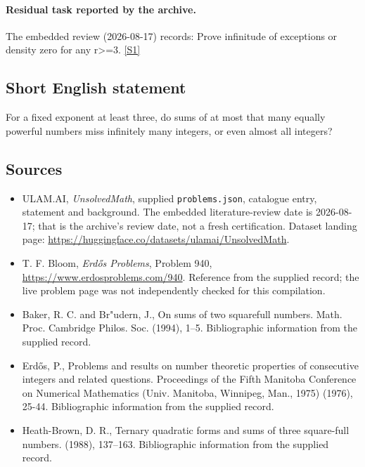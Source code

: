 \documentclass[11pt,a4paper]{article}
\newcommand{\sref}[2]{\hyperlink{source:#1:#2}{[S#2]}}
\begin{document}
\paragraph{Residual task reported by the archive.}

The embedded review (2026-08-17) records: Prove infinitude of exceptions or density zero for any r>=3. \sref{statement}{1}

\subsection{Short English statement}

For a fixed exponent at least three, do sums of at most that many equally powerful numbers miss infinitely many integers, or even almost all integers?

\subsection{Sources}

{\small

\begin{itemize}

\item[\hypertarget{source:statement:1}{S1}] ULAM.AI, \emph{UnsolvedMath}, supplied \texttt{problems.json}, catalogue entry, statement and background. The embedded literature-review date is 2026-08-17; that is the archive’s review date, not a fresh certification. Dataset landing page: \url{https://huggingface.co/datasets/ulamai/UnsolvedMath}.

\item[\hypertarget{source:statement:2}{S2}] T. F. Bloom, \emph{Erdős Problems}, Problem 940, \url{https://www.erdosproblems.com/940}. Reference from the supplied record; the live problem page was not independently checked for this compilation.

\item[\hypertarget{source:statement:3}{S3}] Baker, R. C. and Br"udern, J., On sums of two squarefull numbers. Math. Proc. Cambridge Philos. Soc. (1994), 1--5. Bibliographic information from the supplied record.

\item[\hypertarget{source:statement:4}{S4}] Erd\H{o}s, P., Problems and results on number theoretic properties of consecutive integers and related questions. Proceedings of the Fifth Manitoba Conference on Numerical Mathematics (Univ. Manitoba, Winnipeg, Man., 1975) (1976), 25-44. Bibliographic information from the supplied record.

\item[\hypertarget{source:statement:5}{S5}] Heath-Brown, D. R., Ternary quadratic forms and sums of three square-full numbers. (1988), 137--163. Bibliographic information from the supplied record.

\end{itemize}

}

\label{end:statement}
\end{document}
